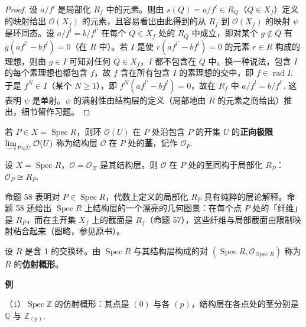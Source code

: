 \begin{proof}
设 \(a/f^l\) 是局部化 \(R_f\) 中的元素。则由 \(s(Q) = a/f^l \in R_Q\)（\(Q \in X_f\)）定义的映射给出 \(\mathcal{O}(X_f)\) 的元素，且容易看出由此得到的从 \(R_f\) 到 \(\mathcal{O}(X_f)\) 的映射 \(\psi\) 是环同态。设 \(a/f^l = b/f^{l'}\) 在每个 \(Q \in X_f\) 处的 \(R_Q\) 中成立，即对某个 \(g \notin Q\) 有 \(g(af^{l'}-bf^l) = 0\)（在 \(R\) 中）。若 \(I\) 是使 \(r(af^{l'}-bf^l) = 0\) 的元素 \(r \in R\) 构成的理想，则由 \(g \in I\) 可知对任何 \(Q \in X_f\)，\(I\) 都不包含在 \(Q\) 中。换一种说法，包含 \(I\) 的每个素理想也都包含 \(f\)，故 \(f\) 含在所有包含 \(I\) 的素理想的交中，即 \(f \in \operatorname{rad}I\). 于是 \(f^N \in I\)（某个 \(N \geq 1\)），即 \(f^N(af^{l'}-bf^l) = 0\)，故在 \(R_f\) 中 \(a/f^l = b/f^{l'}\). 这表明 \(\psi\) 是单射。\(\psi\) 的满射性由结构层的定义（局部地由 \(R\) 的元素之商给出）推出，细节留作习题。
\end{proof}

\begin{definition}
若 \(P \in X = \operatorname{Spec}R\)，则环 \(\mathcal{O}(U)\) 在 \(P\) 处沿包含 \(P\) 的开集 \(U\) 的\textbf{正向极限} \(\varinjlim_{P \in U}\mathcal{O}(U)\) 称为结构层 \(\mathcal{O}\) 在 \(P\) 处的\textbf{茎}，记作 \(\mathcal{O}_P\).
\end{definition}

\begin{proposition}\label{pro:15.58}
设 \(X = \operatorname{Spec}R\)，\(\mathcal{O} = \mathcal{O}_X\) 是其结构层。则 \(\mathcal{O}\) 在 \(P\) 处的茎同构于局部化 \(R_P\)：\(\mathcal{O}_P \cong R_P\).
\end{proposition}

命题 58 表明对 \(P \in \operatorname{Spec}R\)，代数上定义的局部化 \(R_P\) 具有纯粹的层论解释。命题 58 还给出 \(\operatorname{Spec}R\) 上结构层的一个漂亮的几何图景：在每个点 \(P\) 处的「纤维」是 \(R_P\)，而在主开集 \(X_f\) 上的截面是 \(R_f\)（命题 57），这些纤维与局部截面由限制映射粘合起来（图略，参见原书）。

\begin{definition}
设 \(R\) 是含 1 的交换环。由 \(\operatorname{Spec}R\) 与其结构层构成的对 \((\operatorname{Spec}R, \mathcal{O}_{\operatorname{Spec}R})\) 称为 \(R\) 的\textbf{仿射概形}。
\end{definition}

\noindent\textbf{例}

（1）\(\operatorname{Spec}\mathbb{Z}\) 的仿射概形：其点是 \((0)\) 与各 \((p)\)，结构层在各点处的茎分别是 \(\mathbb{Q}\) 与 \(\mathbb{Z}_{(p)}\).

